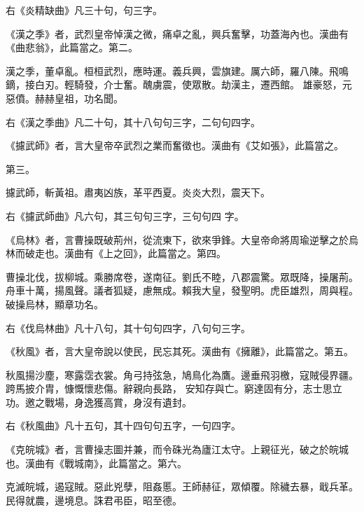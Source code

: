 \begin{pinyinscope}
 右《炎精缺曲》凡三十句，句三字。



 《漢之季》者，武烈皇帝悼漢之微，痛卓之亂，興兵奮擊，功蓋海內也。漢曲有《曲悲翁》，此篇當之。第二。



 漢之季，董卓亂。桓桓武烈，應時運。義兵興，雲旗建。厲六師，羅八陳。飛鳴鏑，接白刃。輕騎發，介士奮。醜虜震，使眾散。劫漢主，遷西館。
 雄豪怒，元惡僨。赫赫皇祖，功名聞。



 右《漢之季曲》凡二十句，其十八句句三字，二句句四字。



 《攄武師》者，言大皇帝卒武烈之業而奮徵也。漢曲有《艾如張》，此篇當之。



 第三。



 攄武師，斬黃祖。肅夷凶族，革平西夏。炎炎大烈，震天下。



 右《攄武師曲》凡六句，其三句句三字，三句句四
 字。



 《烏林》者，言曹操既破荊州，從流東下，欲來爭鋒。大皇帝命將周瑜逆擊之於烏林而破走也。漢曲有《上之回》，此篇當之。第四。



 曹操北伐，拔柳城。乘勝席卷，遂南征。劉氏不睦，八郡震驚。眾既降，操屠荊。舟車十萬，揚風聲。議者狐疑，慮無成。賴我大皇，發聖明。虎臣雄烈，周與程。
 破操烏林，顯章功名。



 右《伐烏林曲》凡十八句，其十句句四字，八句句三字。



 《秋風》者，言大皇帝說以使民，民忘其死。漢曲有《擁離》，此篇當之。第五。



 秋風揚沙塵，寒露霑衣裳。角弓持弦急，鳩鳥化為鷹。邊垂飛羽檄，寇賊侵界疆。跨馬披介胄，慷慨懷悲傷。辭親向長路，
 安知存與亡。窮達固有分，志士思立功。邀之戰場，身逸獲高賞，身沒有遺封。



 右《秋風曲》凡十五句，其十四句句五字，一句四字。



 《克皖城》者，言曹操志圖并兼，而令硃光為廬江太守。上親征光，破之於皖城也。漢曲有《戰城南》，此篇當之。第六。



 克滅皖城，遏寇賊。惡此兇孽，阻姦慝。王師赫征，眾傾覆。除穢去暴，戢兵革。
 民得就農，邊境息。誅君弔臣，昭至德。




\end{pinyinscope}
